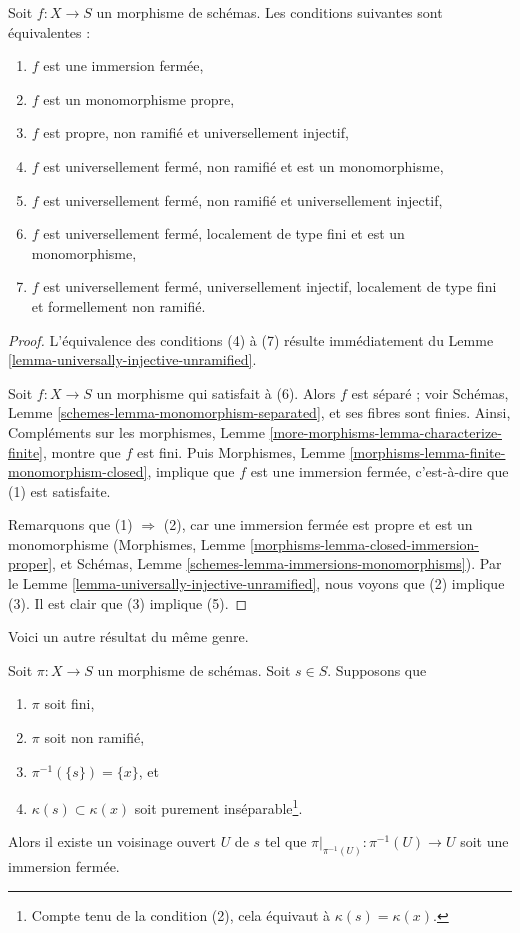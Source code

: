 \begin{lemma}
\label{lemma-characterize-closed-immersion}
Soit $f : X \to S$ un morphisme de schémas.
Les conditions suivantes sont équivalentes :
\begin{enumerate}
\item $f$ est une immersion fermée,
\item $f$ est un monomorphisme propre,
\item $f$ est propre, non ramifié et universellement injectif,
\item $f$ est universellement fermé, non ramifié et est un monomorphisme,
\item $f$ est universellement fermé, non ramifié et universellement injectif,
\item $f$ est universellement fermé, localement de type fini et est un monomorphisme,
\item $f$ est universellement fermé, universellement injectif, localement de
type fini et formellement non ramifié.
\end{enumerate}
\end{lemma}

\begin{proof}
L'équivalence des conditions (4) à (7) résulte immédiatement du
Lemme \ref{lemma-universally-injective-unramified}.

\medskip\noindent
Soit $f : X \to S$ un morphisme qui satisfait à (6). Alors $f$ est séparé ; voir
Schémas, Lemme \ref{schemes-lemma-monomorphism-separated},
et ses fibres sont finies. Ainsi,
Compléments sur les morphismes, Lemme \ref{more-morphisms-lemma-characterize-finite},
montre que $f$ est fini. Puis
Morphismes, Lemme \ref{morphisms-lemma-finite-monomorphism-closed},
implique que $f$ est une immersion fermée, c'est-à-dire que (1) est satisfaite.

\medskip\noindent
Remarquons que (1) $\Rightarrow$ (2), car une immersion fermée est
propre et est un monomorphisme
(Morphismes, Lemme \ref{morphisms-lemma-closed-immersion-proper},
et
Schémas, Lemme \ref{schemes-lemma-immersions-monomorphisms}).
Par le
Lemme \ref{lemma-universally-injective-unramified},
nous voyons que (2) implique (3). Il est clair que (3) implique (5).
\end{proof}

\noindent
Voici un autre résultat du même genre.

\begin{lemma}
\label{lemma-finite-unramified-one-point}
Soit $\pi : X \to S$ un morphisme de schémas. Soit $s \in S$.
Supposons que
\begin{enumerate}
\item $\pi$ soit fini,
\item $\pi$ soit non ramifié,
\item $\pi^{-1}(\{s\}) = \{x\}$, et
\item $\kappa(s) \subset \kappa(x)$ soit purement
inséparable\footnote{Compte tenu de la condition (2),
cela équivaut à $\kappa(s) = \kappa(x)$.}.
\end{enumerate}
Alors il existe un voisinage ouvert $U$ de $s$ tel que
$\pi|_{\pi^{-1}(U)} : \pi^{-1}(U) \to U$ soit une immersion fermée.
\end{lemma}


